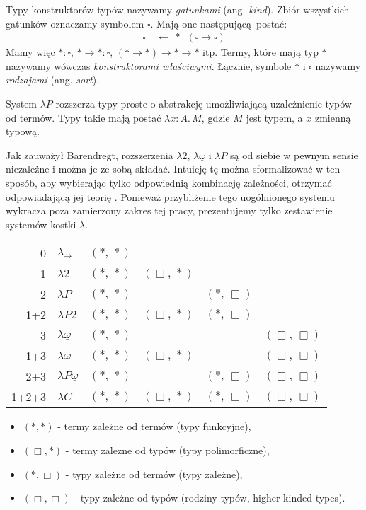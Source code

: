 Typy konstruktorów typów nazywamy \emph{gatunkami} (ang. \emph{kind}). Zbiór wszystkich gatunków oznaczamy symbolem \(\square\). Mają one następującą postać:
  \begin{align*}
    \square\ &\leftarrow\ \ast |\ (\square\to\square)
  \end{align*}
Mamy   więc    \(\ast:\square\),   \(\ast\to\ast    :   \square\),
\((\ast\to\ast)\to\ast\to\ast\)  itp.   Termy,  które   mają  typ
\(\ast\)  nazywamy   wówczas  \emph{konstruktorami  właściwymi}.
Łącznie, symbole \(\ast\)  i \(\square\) nazywamy \emph{rodzajami}
(ang. \emph{sort}).

System \(\lambda P\) rozszerza typy proste o abstrakcję umożliwiającą uzależnienie typów od termów. Typy takie mają postać \(\lambda x:A.\,M\), gdzie \(M\) jest typem, a \(x\) zmienną typową. 

Jak zauważył Barendregt, rozszerzenia \(\lambda 2\), \(\lambda{\underline{\omega}}\) i \(\lambda P\) są od siebie w pewnym sensie niezależne i można je ze sobą składać. Intuicję tę można sformalizować  w ten sposób, aby wybierając tylko odpowiednią kombinację zależności, otrzymać odpowiadającą jej teorię \cite{barendregt_1991}. Ponieważ przybliżenie tego uogólnionego systemu wykracza poza zamierzony zakres tej pracy, prezentujemy tylko zestawienie systemów kostki \(\lambda\).

  \begin{center}
  \begin{tabular}{r | l | c c c c}
    0 & \(\lambda_{\to}\)                 & \((*,\,*)\) \\
    1 & \(\lambda 2\)                     & \((*,\,*)\) & \((\Box,\,*)\) \\
    2 & \(\lambda P\)                     & \((*,\,*)\) & & \((*,\,\Box)\) \\
    1+2 & \(\lambda P2\)                  & \((*,\,*)\) & \((\Box,\,*)\) & \((*,\,\Box)\) \\
    3 & \(\lambda \underline{\omega}\)    & \((*,\,*)\) & & & \((\Box,\,\Box)\)\\
    1+3 & \(\lambda \omega\)              & \((*,\,*)\) & \((\Box,\,*)\) & & \((\Box,\,\Box)\)\\
    2+3 & \(\lambda P\underline{\omega}\) & \((*,\,*)\) & & \((*,\,\Box)\) & \((\Box,\,\Box)\) \\
    1+2+3 & \(\lambda C\)                 & \((*,\,*)\) & \((\Box,\,*)\) & \((*,\,\Box)\) & \((\Box,\,\Box)\) \\
  \end{tabular}

  \begin{itemize}
    \item \((*,*)\) - termy zależne od termów (typy funkcyjne),
    \item \((\Box,*)\) - termy zalezne od typów (typy polimorficzne),
    \item \((*,\Box)\) - typy zależne od termów (typy zależne),
    \item \((\Box, \Box)\) - typy zależne od typów (rodziny typów, higher-kinded types).
  \end{itemize}
  \end{center}

